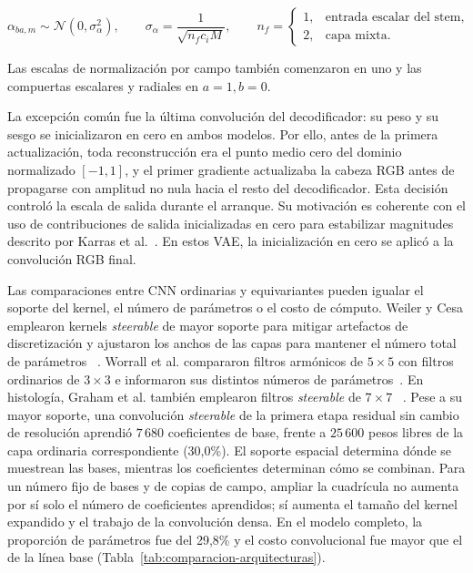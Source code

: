 \begin{equation}
    \alpha_{ba,m}\sim\mathcal N(0,\sigma_\alpha^2),
    \qquad
    \sigma_\alpha=\frac{1}{\sqrt{n_f c_iM}},
    \qquad
    n_f=\begin{cases}1,&\text{entrada escalar del stem},\\2,&\text{capa mixta}.
    \end{cases}
    \label{eq:inicializacion-coeficientes-so2}
\end{equation}

Las escalas
de normalización por campo también comenzaron en uno y las compuertas
escalares y radiales en \(a=1,b=0\).

La excepción común fue la última convolución del decodificador: su peso y su
sesgo se inicializaron en cero en ambos modelos. Por ello, antes de la primera
actualización, toda reconstrucción era el punto medio cero del dominio
normalizado \([-1,1]\), y el primer gradiente actualizaba la cabeza RGB antes
de propagarse con amplitud no nula hacia el resto del decodificador. Esta
decisión controló la escala de salida durante el arranque. Su motivación es
coherente con el uso de contribuciones de salida inicializadas en cero para
estabilizar magnitudes descrito por Karras et al.~\cite{karras_training_2024}.
En estos VAE, la inicialización en cero se aplicó a la convolución RGB final.

Las comparaciones entre CNN
ordinarias y equivariantes pueden igualar el soporte del kernel, el número
de parámetros o el costo de cómputo. Weiler y Cesa emplearon kernels
\emph{steerable} de mayor soporte para mitigar artefactos de discretización y
ajustaron los anchos de las capas para mantener el número total de parámetros
~\cite{weiler_general_2019}. Worrall et al. compararon filtros armónicos de
\(5\times5\) con filtros ordinarios de \(3\times3\) e informaron sus distintos
números de parámetros~\cite{worrall_harmonic_2017}. En histología, Graham et
al. también emplearon filtros \emph{steerable} de \(7\times7\)
~\cite{graham_dense_2020}. Pese a su mayor soporte, una convolución
\emph{steerable} de la primera etapa residual sin cambio de resolución aprendió
\(7\,680\) coeficientes de base, frente a \(25\,600\) pesos libres de la capa
ordinaria correspondiente (30,0\%). El soporte espacial determina dónde se
muestrean las bases, mientras los coeficientes determinan cómo se combinan.
Para un número fijo de bases y de copias de campo, ampliar la cuadrícula no
aumenta por sí solo el número de coeficientes aprendidos; sí aumenta el tamaño
del kernel expandido y el trabajo de la convolución densa. En el modelo
completo, la proporción de parámetros fue del 29,8\% y el costo convolucional
fue mayor que el de la línea base (Tabla~\ref{tab:comparacion-arquitecturas}).

